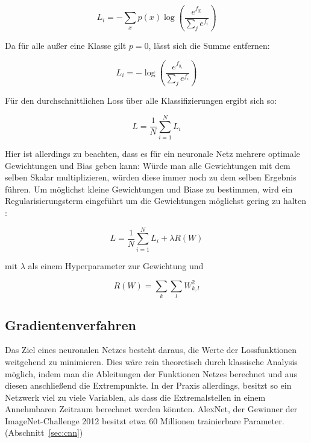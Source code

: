 \begin{equation}
L_i = -\sum_x p(x)\log\left(\frac{e^{f_{y_i}}}{\sum_j e^{f_i}}\right)
\end{equation}

Da für alle außer eine Klasse gilt $p=0$, lässt sich die Summe entfernen:

\begin{equation}
L_i = -\log\left(\frac{e^{f_{y_i}}}{\sum_j e^{f_i}}\right)
\end{equation}


Für den durchschnittlichen Loss über alle Klassifizierungen ergibt sich so:

\begin{equation}
L = \frac{1}{N}\sum_{i=1}^{N}L_i
\end{equation}

Hier ist allerdings zu beachten, dass es für ein neuronale Netz mehrere optimale Gewichtungen und Bias geben kann: Würde man \bspw alle Gewichtungen mit dem selben Skalar multiplizieren, würden diese immer noch zu dem selben Ergebnis führen. Um möglichst kleine Gewichtungen und Biase zu bestimmen, wird ein Regularisierungsterm eingeführt um die Gewichtungen möglichst gering zu halten \cite{cs231n}:

\begin{equation}
\label{eqn:def_loss}
L = \frac{1}{N}\sum_{i=1}^{N}L_i + \lambda R(W)
\end{equation}

mit $\lambda$ als einem Hyperparameter zur Gewichtung und

\begin{equation}
R(W) = \sum_k\sum_l W^2_{k,l}
\end{equation}

\subsection{Gradientenverfahren}
\label{ssec:gradient_descent}

Das Ziel eines neuronalen Netzes besteht daraus, die Werte der Lossfunktionen weitgehend zu minimieren. Dies wäre rein theoretisch durch klassische Analysis möglich, indem man die Ableitungen der Funktionen Netzes berechnet und aus diesen anschließend die Extrempunkte. In der Praxis allerdings, besitzt so ein Netzwerk viel zu viele Variablen, als dass die Extremalstellen in einem Annehmbaren Zeitraum berechnet werden könnten. \cite[Kap.~1]{nielsen_15} AlexNet, der Gewinner der ImageNet-Challenge 2012 besitzt \bspw etwa 60 Millionen trainierbare Parameter. (\Vgl Abschnitt~\ref{sec:cnn})

